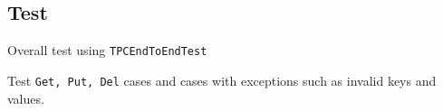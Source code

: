 \documentclass{article}
\begin{document}
\subsection{Test}
\begin{compactitem}
	\item Overall test using \texttt{TPCEndToEndTest}
	\item Test \texttt{Get, Put, Del} cases and cases with exceptions such as invalid keys and values.
\end{compactitem}
\end{document}
